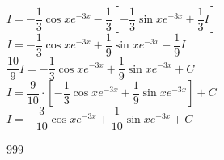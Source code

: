 \documentclass[a4paper]{article}
\begin{document}
$I = -\dfrac{1}{3}\cos x e^{-3x} - \dfrac{1}{3} \left[ -\dfrac{1}{3}\sin x e^{-3x} + \dfrac{1}{3} I \right] $ \\

$I = -\dfrac{1}{3}\cos x e^{-3x} + \dfrac{1}{9} \sin x e^{-3x} - \dfrac{1}{9} I$ \\

$\dfrac{10}{9} I = -\dfrac{1}{3}\cos x e^{-3x} + \dfrac{1}{9} \sin x e^{-3x} + C$ \\

$I = \dfrac{9}{10} \cdot \left[ -\dfrac{1}{3}\cos x e^{-3x} + \dfrac{1}{9} \sin x e^{-3x} \right] + C$ \\

$I = -\dfrac{3}{10} \cos x e^{-3x} + \dfrac{1}{10} \sin x e^{-3x} + C$ \\

\begin{thebibliography}{999}
\end{thebibliography}
\end{document}
